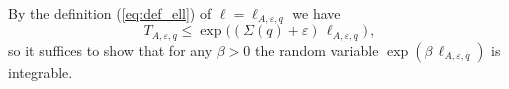\documentclass[reqno,11pt]{amsart}
\numberwithin{equation}{section}
\newcommand{\N}{\mathbb{N}}
\newcommand{\cA}{{\ensuremath{\mathcal A}} }
\newcommand{\cB}{{\ensuremath{\mathcal B}} }
\newcommand{\cF}{{\ensuremath{\mathcal F}} }
\DeclareMathOperator*{\union}{\bigcup}       %
\DeclareMathOperator*{\inter}{\bigcap}       %
\newcommand{\gb}{\beta}
\newcommand{\gep}{\varepsilon}       %
\newcommand{\go}{\omega}
\newcommand{\gS}{\Sigma}
\begin{document}
\medskip

\proof

By the definition (\ref{eq:def_ell}) of $\ell=\ell_{A,\gep,q}$ we have
\begin{equation}
T_{A,\gep,q} \le \exp\big( (\gS(q) + \gep)\, \ell_{A,\gep,q} \big)\,,
\end{equation}
so it suffices to show that for any $\gb>0$ the random variable $\exp(\gb\, \ell_{A,\gep,q})$ is integrable.
\end{document}
